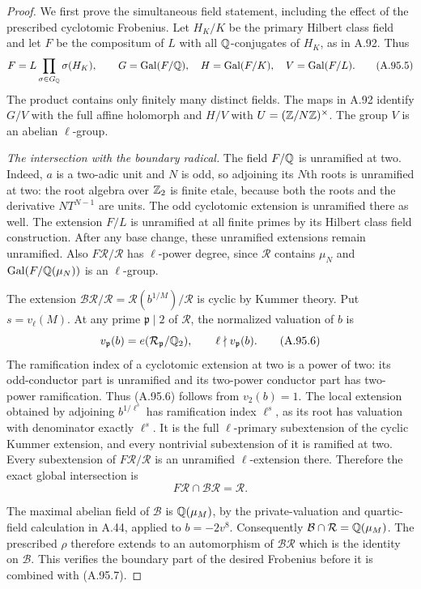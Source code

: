 \begin{proof}
We first prove the simultaneous field statement, including
the effect of the prescribed cyclotomic Frobenius.
Let $H_K/K$ be the primary Hilbert class field and let $F$
be the compositum of $L$ with all $\mathbb Q$-conjugates of $H_K$,
as in A.92.  Thus
\[
 F=L\prod_{\sigma\in G_\mathbb Q}\sigma(H_K),\qquad
 G=\operatorname{Gal}(F/\mathbb Q),\quad
 H=\operatorname{Gal}(F/K),\quad V=\operatorname{Gal}(F/L).
 \tag{A.95.5}
\]
The product contains only finitely many distinct fields.
The maps in A.92 identify $G/V$ with the full affine
holomorph and $H/V$ with $U=(\mathbb Z/N\mathbb Z)^\times$.
The group $V$ is an abelian $\ell$-group.

\emph{The intersection with the boundary radical.}
The field $F/\mathbb Q$ is unramified at two.
Indeed, $a$ is a two-adic unit and $N$ is odd, so adjoining
its $N$th roots is unramified at two: the root algebra over
$\mathbb Z_2$ is finite etale, because both the roots and the
derivative $NT^{N-1}$ are units.
The odd cyclotomic extension is unramified there as well.
The extension $F/L$ is unramified at all finite primes by
its Hilbert class field construction.
After any base change, these unramified extensions remain
unramified.  Also $F\mathcal R/\mathcal R$ has $\ell$-power
degree, since $\mathcal R$ contains $\mu_N$ and
$\operatorname{Gal}(F/\mathbb Q(\mu_N))$ is an $\ell$-group.

The extension $\mathcal B\mathcal R/\mathcal R
=\mathcal R(b^{1/M})/\mathcal R$ is cyclic by Kummer theory.
Put $s=v_\ell(M)$.
At any prime $\mathfrak p\mid2$ of $\mathcal R$, the normalized
valuation of $b$ is
\[
 v_{\mathfrak p}(b)=e(\mathcal R_{\mathfrak p}/\mathbb Q_2),
                  \qquad \ell\nmid v_{\mathfrak p}(b).
 \tag{A.95.6}
\]
The ramification index of a cyclotomic extension at two is
a power of two: its odd-conductor part is unramified and
its two-power conductor part has two-power ramification.
Thus (A.95.6) follows from $v_2(b)=1$.
The local extension obtained by adjoining $b^{1/\ell^s}$
has ramification index $\ell^s$, as its root has valuation
with denominator exactly $\ell^s$.
It is the full $\ell$-primary subextension of the cyclic
Kummer extension, and every nontrivial subextension of
it is ramified at two.
Every subextension of $F\mathcal R/\mathcal R$ is an
unramified $\ell$-extension there.  Therefore the exact
global intersection is
\[
             F\mathcal R\cap\mathcal B\mathcal R
                                      =\mathcal R.
 \tag{A.95.7}
\]

The maximal abelian field of $\mathcal B$ is
$\mathbb Q(\mu_M)$, by the private-valuation and quartic-field
calculation in A.44, applied to $b=-2v^8$.
Consequently
$\mathcal B\cap\mathcal R=\mathbb Q(\mu_M)$.
The prescribed $\rho$ therefore extends to an automorphism
of $\mathcal B\mathcal R$ which is the identity on
$\mathcal B$.
This verifies the boundary part of the desired Frobenius
before it is combined with (A.95.7).


\end{proof}
